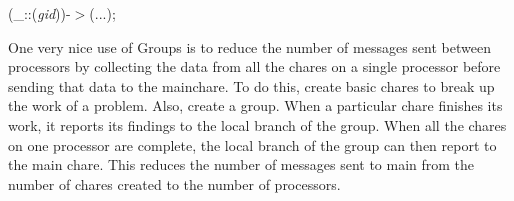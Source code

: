 (\_::({\it gid}))-$>$(...);\\

One very nice use of Groups is to reduce the number of messages sent between processors by collecting the data from all the chares on a single processor before sending that data to the mainchare.  To do this, create basic chares to break up the work of a problem.  Also, create a group.  When a particular chare finishes its work, it reports its findings to the local branch of the group.  When all the chares on one processor are complete, the local branch of the group can then report to the main chare.  This reduces the number of messages sent to main from the number of chares created to the number of processors.     






